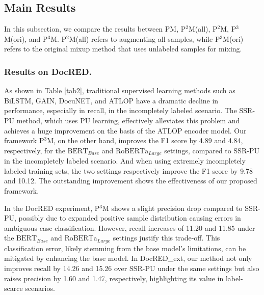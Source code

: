 \documentclass[letterpaper]{article} %
\begin{document}
\subsection{Main Results}\label{sec4.2}
In this subsection, we compare the results between PM, P$^{2}$M(all), P$^{2}$M, P$^{3}$M(ori), and P$^{3}$M. P$^{2}$M(all) refers to augmenting all samples, while P$^{3}$M(ori) refers to the original mixup method that uses unlabeled samples for mixing.

\subsubsection{Results on DocRED.}
As shown in Table \ref{tab2}, traditional supervised learning methods such as BiLSTM, GAIN, DocuNET, and ATLOP have a dramatic decline in performance, especially in recall, in the incompletely labeled scenario. The SSR-PU method, which uses PU learning, effectively alleviates this problem and achieves a huge improvement on the basis of the ATLOP encoder model. Our framework P$^{3}$M, on the other hand, improves the F1 score by 4.89 and 4.84, respectively, for the $\mathrm{BERT}_{Base}$ and $\mathrm{RoBERTa}_{Large}$ settings, compared to SSR-PU in the incompletely labeled scenario. And when using extremely incompletely labeled training sets, the two settings respectively improve the F1 score by 9.78 and 10.12. The outstanding improvement shows the effectiveness of our proposed framework.

In the DocRED experiment, P$^{3}$M shows a slight precision drop compared to SSR-PU, possibly due to expanded positive sample distribution causing errors in ambiguous case classification. However, recall increases of 11.20 and 11.85 under the $\mathrm{BERT}_{Base}$ and $\mathrm{RoBERTa}_{Large}$ settings justify this trade-off. This classification error, likely stemming from the base model's limitations, can be mitigated by enhancing the base model. In DocRED\_ext, our method not only improves recall by 14.26 and 15.26 over SSR-PU under the same settings but also raises precision by 1.60 and 1.47, respectively, highlighting its value in label-scarce scenarios.
\end{document}

